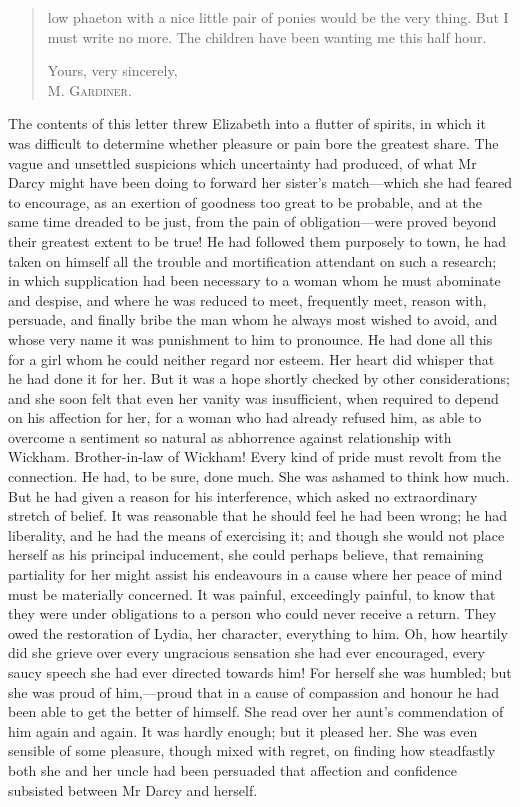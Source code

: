 \begin{quotation}
low phaeton with a nice little pair of ponies would be the very thing. But I must write no more. The children have been wanting me this half hour.\\

\begin{flushright}
Yours, very sincerely,\\
\textsc{M. Gardiner.}
\end{flushright}

\end{quotation}

The contents of this letter threw Elizabeth into a flutter of spirits, in which it was difficult to determine whether pleasure or pain bore the greatest share. The vague and unsettled suspicions which uncertainty had produced, of what Mr Darcy might have been doing to forward her sister's match—which she had feared to encourage, as an exertion of goodness too great to be probable, and at the same time dreaded to be just, from the pain of obligation—were proved beyond their greatest extent to be true! He had followed them purposely to town, he had taken on himself all the trouble and mortification attendant on such a research; in which supplication had been necessary to a woman whom he must abominate and despise, and where he was reduced to meet, frequently meet, reason with, persuade, and finally bribe the man whom he always most wished to avoid, and whose very name it was punishment to him to pronounce. He had done all this for a girl whom he could neither regard nor esteem. Her heart did whisper that he had done it for her. But it was a hope shortly checked by other considerations; and she soon felt that even her vanity was insufficient, when required to depend on his affection for her, for a woman who had already refused him, as able to overcome a sentiment so natural as abhorrence against relationship with Wickham. Brother-in-law of Wickham! Every kind of pride must revolt from the connection. He had, to be sure, done much. She was ashamed to think how much. But he had given a reason for his interference, which asked no extraordinary stretch of belief. It was reasonable that he should feel he had been wrong; he had liberality, and he had the means of exercising it; and though she would not place herself as his principal inducement, she could perhaps believe, that remaining partiality for her might assist his endeavours in a cause where her peace of mind must be materially concerned. It was painful, exceedingly painful, to know that they were under obligations to a person who could never receive a return. They owed the restoration of Lydia, her character, everything to him. Oh, how heartily did she grieve over every ungracious sensation she had ever encouraged, every saucy speech she had ever directed towards him! For herself she was humbled; but she was proud of him,—proud that in a cause of compassion and honour he had been able to get the better of himself. She read over her aunt's commendation of him again and again. It was hardly enough; but it pleased her. She was even sensible of some pleasure, though mixed with regret, on finding how steadfastly both she and her uncle had been persuaded that affection and confidence subsisted between Mr Darcy and herself.

